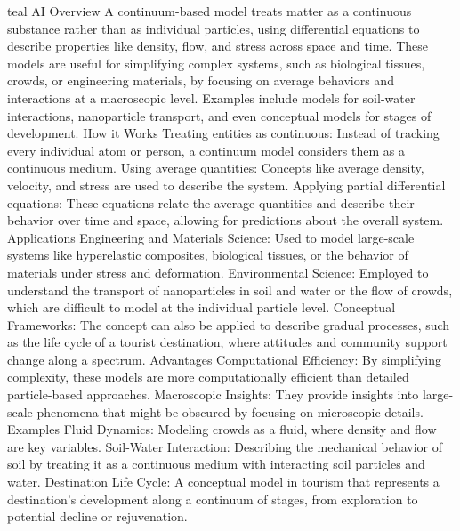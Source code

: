\begin{color}{teal}
AI Overview
A continuum-based model treats matter as a continuous substance rather than as individual particles, using differential equations to describe properties like density, flow, and stress across space and time. These models are useful for simplifying complex systems, such as biological tissues, crowds, or engineering materials, by focusing on average behaviors and interactions at a macroscopic level. Examples include models for soil-water interactions, nanoparticle transport, and even conceptual models for stages of development. 
How it Works
Treating entities as continuous: Instead of tracking every individual atom or person, a continuum model considers them as a continuous medium. 
Using average quantities: Concepts like average density, velocity, and stress are used to describe the system. 
Applying partial differential equations: These equations relate the average quantities and describe their behavior over time and space, allowing for predictions about the overall system. 
Applications
Engineering and Materials Science: Used to model large-scale systems like hyperelastic composites, biological tissues, or the behavior of materials under stress and deformation. 
Environmental Science: Employed to understand the transport of nanoparticles in soil and water or the flow of crowds, which are difficult to model at the individual particle level. 
Conceptual Frameworks: The concept can also be applied to describe gradual processes, such as the life cycle of a tourist destination, where attitudes and community support change along a spectrum. 
Advantages
Computational Efficiency: By simplifying complexity, these models are more computationally efficient than detailed particle-based approaches. 
Macroscopic Insights: They provide insights into large-scale phenomena that might be obscured by focusing on microscopic details. 
Examples
Fluid Dynamics: Modeling crowds as a fluid, where density and flow are key variables. 
Soil-Water Interaction: Describing the mechanical behavior of soil by treating it as a continuous medium with interacting soil particles and water. 
Destination Life Cycle: A conceptual model in tourism that represents a destination's development along a continuum of stages, from exploration to potential decline or rejuvenation. 
\end{color}

